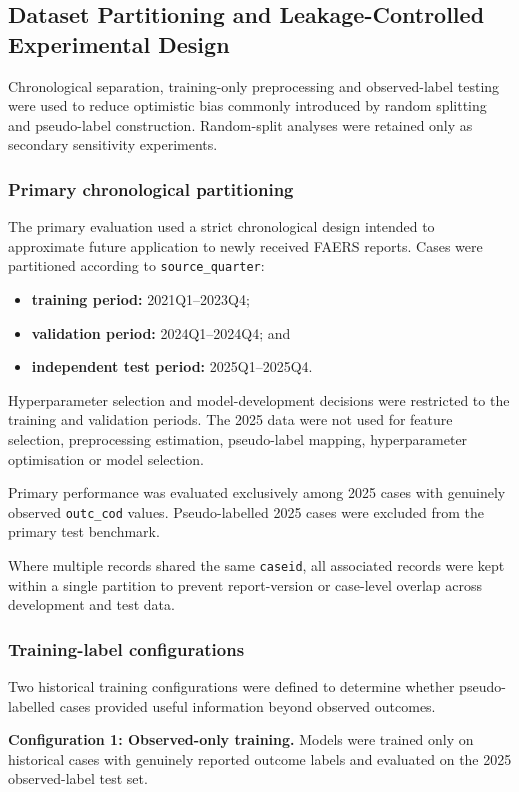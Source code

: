 \documentclass[10pt]{article}
\begin{document}
\subsection{Dataset Partitioning and Leakage-Controlled Experimental Design}
Chronological separation, training-only preprocessing and observed-label testing were used to reduce optimistic bias commonly introduced by random splitting and pseudo-label construction. Random-split analyses were retained only as secondary sensitivity experiments.

\subsubsection{Primary chronological partitioning}
The primary evaluation used a strict chronological design intended to approximate future application to newly received FAERS reports. Cases were partitioned according to \texttt{source\_quarter}:
\begin{itemize}
\item \textbf{training period:} 2021Q1--2023Q4;
\item \textbf{validation period:} 2024Q1--2024Q4; and
\item \textbf{independent test period:} 2025Q1--2025Q4.
\end{itemize}
Hyperparameter selection and model-development decisions were restricted to the training and validation periods. The 2025 data were not used for feature selection, preprocessing estimation, pseudo-label mapping, hyperparameter optimisation or model selection.

Primary performance was evaluated exclusively among 2025 cases with genuinely observed \texttt{outc\_cod} values. Pseudo-labelled 2025 cases were excluded from the primary test benchmark.

Where multiple records shared the same \texttt{caseid}, all associated records were kept within a single partition to prevent report-version or case-level overlap across development and test data.

\subsubsection{Training-label configurations}
Two historical training configurations were defined to determine whether pseudo-labelled cases provided useful information beyond observed outcomes.

\textbf{Configuration 1: Observed-only training.}
Models were trained only on historical cases with genuinely reported outcome labels and evaluated on the 2025 observed-label test set.
\end{document}
